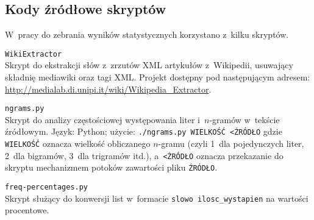 \documentclass[12pt,a4paper,twoside]{article}
\newcounter{sccounter} %
\begin{document}
\begin{appendices}
\section{Kody źródłowe skryptów}
W~pracy do zebrania wyników statystycznych korzystano z~kilku skryptów.

\begin{myenumerate}

    \item {}\label{sc:wiki_extractor}
    \texttt{WikiExtractor} \\
    Skrypt do ekstrakcji słów z~zrzutów XML artykułów z~Wikipedii, usuwający
    składnię mediawiki oraz tagi XML. Projekt dostępny pod następującym
    \mbox{adresem}: \url{http://medialab.di.unipi.it/wiki/Wikipedia_Extractor}.

    \item {}\label{sc:ngrams_counter}
    \texttt{ngrams.py} \\
    Skrypt do analizy częstościowej występowania liter i~$n$-gramów w~tekście
    źródłowym. Język: Python; użycie: \texttt{./ngrams.py WIELKOŚĆ <ŹRÓDŁO}
    gdzie \texttt{WIELKOŚĆ} oznacza wielkość obliczanego $n$-gramu (czyli 1~dla
    pojedynczych liter, 2~dla bigramów, 3~dla trigramów itd.),
    a~\texttt{<ŹRÓDŁO} oznacza przekazanie do skryptu mechanizmem potoków
    zawartości pliku \texttt{ŹRÓDŁO}.
    

    \pagebreak
    \item {}\label{sc:freq_percentages}
    \texttt{freq-percentages.py} \\
    Skrypt służący do konwersji list w~formacie \texttt{slowo ilosc\_wystapien}
    na wartości procentowe.
    

\end{myenumerate}

\end{appendices}
\end{document}
